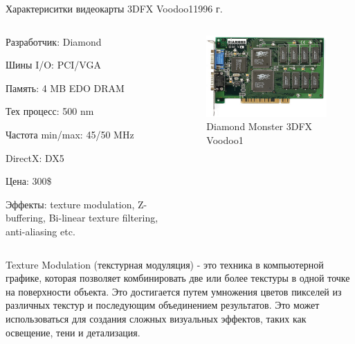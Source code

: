 \documentclass{beamer}
\begin{document}
\begin{frame}{Характериситки видеокарты 3DFX Voodoo1}{1996 г.}
	\begin{columns}
		\begin{column}{0.5\textwidth}
			Разработчик: Diamond
			
			Шины I/O: PCI/VGA
			
			Память: 4 MB EDO DRAM
			
			Тех процесс: 500 nm
			
			Частота min/max: 45/50 MHz
			
			DirectX: DX5
			
			Цена: 300\$
			
			Эффекты: texture modulation, Z-buffering, Bi-linear texture filtering, anti-aliasing etc.
		\end{column}
		\begin{column}{0.5\textwidth}
			\begin{figure} 
				\includegraphics[width=\textwidth]{images/Diamond_Monster_3D_3DFX_Voodoo1.png}
				\caption {Diamond Monster 3DFX Voodoo1}
			\end{figure}
			
		\end{column}
	\end{columns}
	Texture Modulation (текстурная модуляция) 
	- это техника в компьютерной графике, которая позволяет комбинировать две или более текстуры в одной точке на поверхности объекта. Это достигается путем умножения цветов пикселей из различных текстур и последующим объединением результатов. Это может использоваться для создания сложных визуальных эффектов, таких как освещение, тени и детализация.
	

\end{frame}
\end{document}
